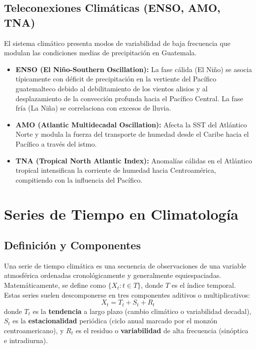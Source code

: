 \documentclass[titlepage,11pt]{report}
\begin{document}
\subsection{Teleconexiones Climáticas (ENSO, AMO, TNA)}
El sistema climático presenta modos de variabilidad de baja frecuencia que modulan las condiciones medias de precipitación en Guatemala.
\begin{itemize}
    \item \textbf{ENSO (El Niño-Southern Oscillation):} La fase cálida (El Niño) se asocia típicamente con déficit de precipitación en la vertiente del Pacífico guatemalteco debido al debilitamiento de los vientos alisios y al desplazamiento de la convección profunda hacia el Pacífico Central. La fase fría (La Niña) se correlaciona con excesos de lluvia.
    \item \textbf{AMO (Atlantic Multidecadal Oscillation):} Afecta la SST del Atlántico Norte y modula la fuerza del transporte de humedad desde el Caribe hacia el Pacífico a través del istmo.
    \item \textbf{TNA (Tropical North Atlantic Index):} Anomalías cálidas en el Atlántico tropical intensifican la corriente de humedad hacia Centroamérica, compitiendo con la influencia del Pacífico.
\end{itemize}

\section{Series de Tiempo en Climatología}

\subsection{Definición y Componentes}
Una serie de tiempo climática es una secuencia de observaciones de una variable atmosférica ordenadas cronológicamente y generalmente equiespaciadas. Matemáticamente, se define como \(\{X_t : t \in T\}\), donde \(T\) es el índice temporal. Estas series suelen descomponerse en tres componentes aditivos o multiplicativos:
\begin{equation}
    X_t = T_t + S_t + R_t
\end{equation}
donde \(T_t\) es la \textbf{tendencia} a largo plazo (cambio climático o variabilidad decadal), \(S_t\) es la \textbf{estacionalidad} periódica (ciclo anual marcado por el monzón centroamericano), y \(R_t\) es el residuo o \textbf{variabilidad} de alta frecuencia (sinóptica e intradiurna).
\end{document}

